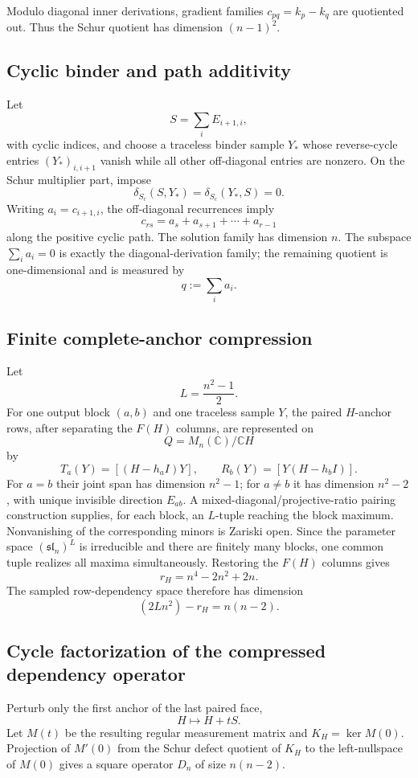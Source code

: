 Modulo diagonal inner derivations, gradient families $c_{pq}=k_p-k_q$ are quotiented out. Thus the Schur quotient has dimension $(n-1)^2$.

\subsection{Cyclic binder and path additivity}
Let
\[
S=\sum_i E_{i+1,i},
\]
with cyclic indices, and choose a traceless binder sample $Y_*$ whose reverse-cycle entries $(Y_*)_{i,i+1}$ vanish while all other off-diagonal entries are nonzero. On the Schur multiplier part, impose
\[
\delta_{S_c}(S,Y_*)=\delta_{S_c}(Y_*,S)=0.
\]
Writing $a_i=c_{i+1,i}$, the off-diagonal recurrences imply
\begin{equation}\label{eq:path-additive-app}
c_{rs}=a_s+a_{s+1}+\cdots+a_{r-1}
\end{equation}
along the positive cyclic path. The solution family has dimension $n$. The subspace $\sum_i a_i=0$ is exactly the diagonal-derivation family; the remaining quotient is one-dimensional and is measured by
\[
q:=\sum_i a_i.
\]

\subsection{Finite complete-anchor compression}
Let
\[
L=\frac{n^2-1}{2}.
\]
For one output block $(a,b)$ and one traceless sample $Y$, the paired $H$-anchor rows, after separating the $F(H)$ columns, are represented on
\[
Q=M_n(\mathbb C)/\mathbb C H
\]
by
\[
T_a(Y)=[(H-h_aI)Y],\qquad R_b(Y)=[Y(H-h_bI)].
\]
For $a=b$ their joint span has dimension $n^2-1$; for $a\ne b$ it has dimension $n^2-2$, with unique invisible direction $E_{ab}$. A mixed-diagonal/projective-ratio pairing construction supplies, for each block, an $L$-tuple reaching the block maximum. Nonvanishing of the corresponding minors is Zariski open. Since the parameter space $(\mathfrak{sl}_n)^L$ is irreducible and there are finitely many blocks, one common tuple realizes all maxima simultaneously. Restoring the $F(H)$ columns gives
\begin{equation}\label{eq:rH}
r_H=n^4-2n^2+2n.
\end{equation}
The sampled row-dependency space therefore has dimension
\begin{equation}\label{eq:left-null}
(2Ln^2)-r_H=n(n-2).
\end{equation}

\subsection{Cycle factorization of the compressed dependency operator}
Perturb only the first anchor of the last paired face,
\[
H\longmapsto H+tS.
\]
Let $M(t)$ be the resulting regular measurement matrix and $K_H=\ker M(0)$. Projection of $M'(0)$ from the Schur defect quotient of $K_H$ to the left-nullspace of $M(0)$ gives a square operator $D_n$ of size $n(n-2)$.

